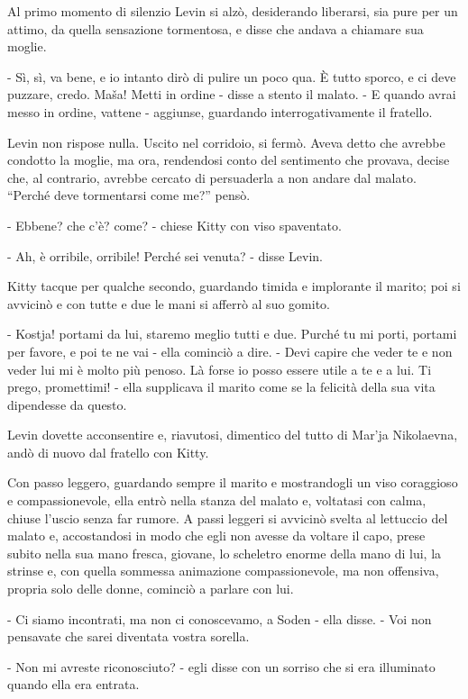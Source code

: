 Al primo momento di silenzio Levin si alzò, desiderando liberarsi, sia pure per un attimo, da quella sensazione tormentosa, e disse che andava a chiamare sua moglie. 

- Sì, sì, va bene, e io intanto dirò di pulire un poco qua. È tutto sporco, e ci deve puzzare, credo. Maša! Metti in ordine - disse a stento il malato. - E quando avrai messo in ordine, vattene - aggiunse, guardando interrogativamente il fratello. 

Levin non rispose nulla. Uscito nel corridoio, si fermò. Aveva detto che avrebbe condotto la moglie, ma ora, rendendosi conto del sentimento che provava, decise che, al contrario, avrebbe cercato di persuaderla a non andare dal malato. ``Perché deve tormentarsi come me?'' pensò. 

- Ebbene? che c'è? come? - chiese Kitty con viso spaventato. 

- Ah, è orribile, orribile! Perché sei venuta? - disse Levin. 

Kitty tacque per qualche secondo, guardando timida e implorante il marito; poi si avvicinò e con tutte e due le mani si afferrò al suo gomito. 

- Kostja! portami da lui, staremo meglio tutti e due. Purché tu mi porti, portami per favore, e poi te ne vai - ella cominciò a dire. - Devi capire che veder te e non veder lui mi è molto più penoso. Là forse io posso essere utile a te e a lui. Ti prego, promettimi! - ella supplicava il marito come se la felicità della sua vita dipendesse da questo. 

Levin dovette acconsentire e, riavutosi, dimentico del tutto di Mar'ja Nikolaevna, andò di nuovo dal fratello con Kitty. 

Con passo leggero, guardando sempre il marito e mostrandogli un viso coraggioso e compassionevole, ella entrò nella stanza del malato e, voltatasi con calma, chiuse l'uscio senza far rumore. A passi leggeri si avvicinò svelta al lettuccio del malato e, accostandosi in modo che egli non avesse da voltare il capo, prese subito nella sua mano fresca, giovane, lo scheletro enorme della mano di lui, la strinse e, con quella sommessa animazione compassionevole, ma non offensiva, propria solo delle donne, cominciò a parlare con lui. 

- Ci siamo incontrati, ma non ci conoscevamo, a Soden - ella disse. - Voi non pensavate che sarei diventata vostra sorella. 

- Non mi avreste riconosciuto? - egli disse con un sorriso che si era illuminato quando ella era entrata. 

